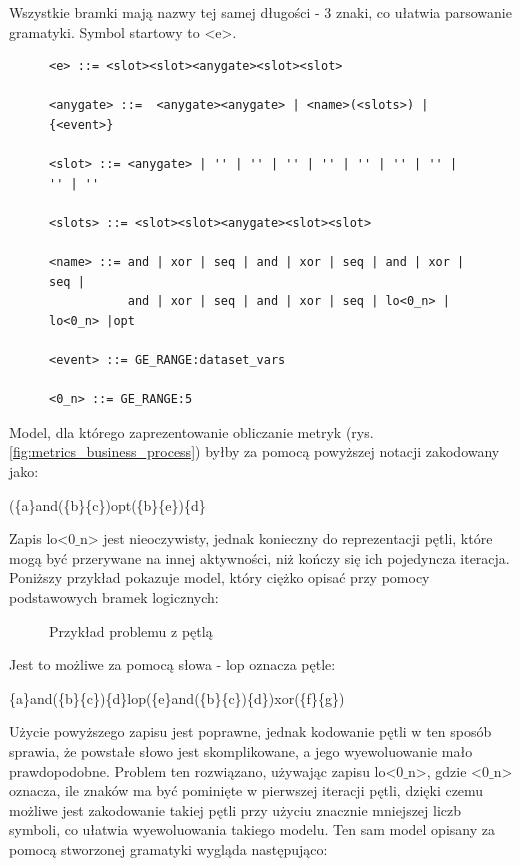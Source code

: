 Wszystkie bramki mają nazwy tej samej długości - 3 znaki, co ułatwia parsowanie gramatyki. Symbol startowy to <e>.

\begin{figure}[!ht]
\lstset{caption=Proponowana gramatyka procesu biznesowego, captionpos=b}
\lstset{label=src:grammar, frame=single}
\begin{lstlisting}
<e> ::= <slot><slot><anygate><slot><slot>

<anygate> ::=  <anygate><anygate> | <name>(<slots>) | {<event>}

<slot> ::= <anygate> | '' | '' | '' | '' | '' | '' | '' | '' | ''

<slots> ::= <slot><slot><anygate><slot><slot>

<name> ::= and | xor | seq | and | xor | seq | and | xor | seq | 
           and | xor | seq | and | xor | seq | lo<0_n> | lo<0_n> |opt

<event> ::= GE_RANGE:dataset_vars

<0_n> ::= GE_RANGE:5
\end{lstlisting}
\end{figure}

Model, dla którego zaprezentowanie obliczanie metryk (rys. \ref{fig:metrics_business_process}) byłby za pomocą powyższej notacji zakodowany jako:
\begin{center}
(\{a\}and(\{b\}\{c\})opt(\{b\}\{e\})\{d\}
\end{center}

Zapis lo<0$\_$n> jest nieoczywisty, jednak konieczny do reprezentacji pętli, które mogą być przerywane na innej aktywności, niż kończy się ich pojedyncza iteracja.  
Poniższy przykład pokazuje model, który ciężko opisać przy pomocy podstawowych bramek logicznych: 
\begin{figure}[H]
	\caption{\label{fig:subcaption_example}Przykład problemu z pętlą}
\end{figure}
\noindent Jest to możliwe za pomocą słowa - lop oznacza pętle: 
\begin{center}
\{a\}and(\{b\}\{c\})\{d\}lop(\{e\}and(\{b\}\{c\})\{d\})xor(\{f\}\{g\})
\end{center}
Użycie powyższego zapisu jest poprawne, jednak kodowanie pętli w ten sposób sprawia, że powstałe słowo jest skomplikowane, a jego wyewoluowanie mało prawdopodobne. Problem ten rozwiązano, używając zapisu  lo<0$\_$n>, gdzie <0$\_$n> oznacza, ile znaków ma być pominięte w pierwszej iteracji pętli, dzięki czemu możliwe jest zakodowanie takiej pętli przy użyciu znacznie mniejszej liczb symboli, co ułatwia wyewoluowania takiego modelu. Ten sam model opisany za pomocą stworzonej gramatyki wygląda następująco:

